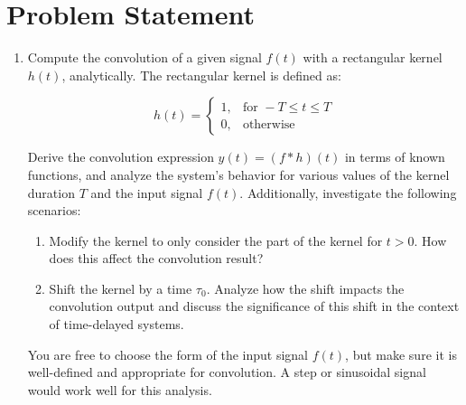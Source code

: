 \documentclass[12pt]{article}
\begin{document}
\section{Problem Statement}
\begin{enumerate}
\item Compute the convolution of a given signal $f(t)$ with a rectangular kernel $h(t)$, analytically. The rectangular kernel is defined as:

\begin{equation}
h(t) =
\begin{cases}
1, & \text{for } -T \leq t \leq T \\
0, & \text{otherwise}
\end{cases}
\end{equation}

Derive the convolution expression $y(t) = (f * h)(t)$ in terms of known functions, and analyze the system's behavior for various values of the kernel duration $T$ and the input signal $f(t)$. Additionally, investigate the following scenarios:

\begin{enumerate}
\item Modify the kernel to only consider the part of the kernel for $t > 0$. How does this affect the convolution result?

\item Shift the kernel by a time $\tau_0$. Analyze how the shift impacts the convolution output and discuss the significance of this shift in the context of time-delayed systems.
\end{enumerate}

You are free to choose the form of the input signal $f(t)$, but make sure it is well-defined and appropriate for convolution. A step or sinusoidal signal would work well for this analysis.
\end{enumerate}








\end{document}
